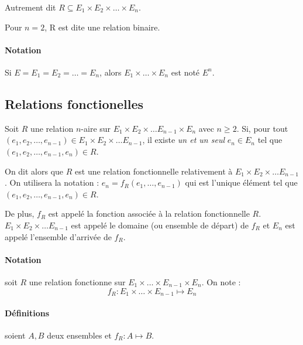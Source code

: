 \documentclass[12pt, a4paper]{report}
\begin{document}
Autrement dit $R \subseteq E_1 \times E_2 \times \dots \times E_n$.


Pour $n = 2$, R est dite une relation binaire.

\paragraph{Notation} Si $E = E_1 = E_2 = \dots = E_n$, alors $E_1 \times \dots
\times E_n$ est noté $E^{n}$.



\subsection{Relations fonctionelles}

Soit $R$ une relation $n$-aire sur $E_1\times E_2\times\dots
E_{n-1}\times E_n$ avec $n\geq 2$. Si, pour tout
$(e_1,e_2,\dots,e_{n-1})\in E_1\times E_2\times\dots E_{n-1}$, il
existe \textit{un et un seul} $e_n\in E_n$ tel que
$(e_1,e_2,\dots,e_{n-1},e_n) \in R$.

On dit alors que $R$ est une relation fonctionnelle relativement à
$E_1\times E_2\times\dots E_{n-1}$. On utilisera la notation : $e_n =
f_R(e_1,\dots,e_{n-1})$ qui est l'unique élément tel que
$(e_1,e_2,\dots,e_{n-1},e_n)\in R$.

De plus, $f_R$ est appelé la fonction associée à la relation
fonctionnelle $R$. $E_1\times E_2\times\dots E_{n-1}$ est appelé le
domaine (ou ensemble de départ) de $f_R$ et $E_n$ est appelé
l'ensemble d'arrivée de $f_R$.

\paragraph{Notation} soit $R$ une relation fonctionne sur $E_1\times\dots\times
E_{n-1}\times E_n$. On note :
\[
f_R : E_1\times\dots\times E_{n-1} \longmapsto E_n
\]

\paragraph{Définitions} soient $A, B$ deux ensembles et $f_R : A\mapsto B$.
\end{document}

